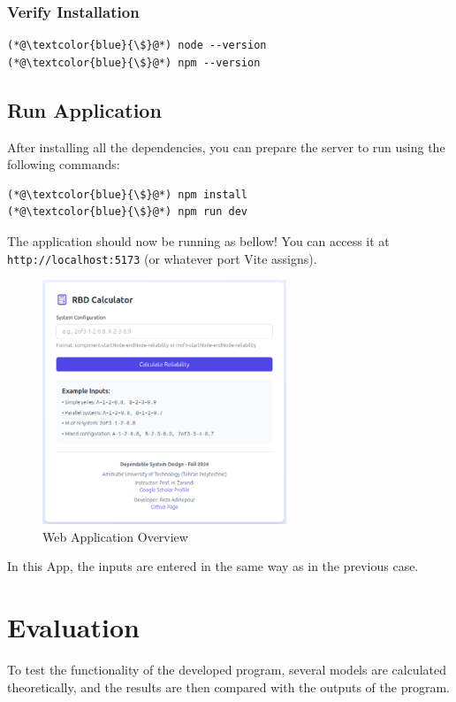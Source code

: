 \documentclass[12pt	]{article}
\begin{document}
\subsubsection{Verify Installation}
\begin{lstlisting}
(*@\textcolor{blue}{\$}@*) node --version
(*@\textcolor{blue}{\$}@*) npm --version
\end{lstlisting}



\subsection{Run Application}
After installing all the dependencies, you can prepare the server to run using the following commands:

\begin{lstlisting}
(*@\textcolor{blue}{\$}@*) npm install
(*@\textcolor{blue}{\$}@*) npm run dev
\end{lstlisting}

The application should now be running as bellow! You can access it at \texttt{http://localhost:5173} (or whatever port Vite assigns).


\begin{figure}[h]
	\centering
	\includegraphics[width=0.65\textwidth]{Images/img2.png}
	\caption{Web Application Overview}
	\label{fig:WebApp}
\end{figure}

In this App, the inputs are entered in the same way as in the previous case.



\section{Evaluation}
To test the functionality of the developed program, several models are calculated theoretically, and the results are then compared with the outputs of the program.
\end{document}
